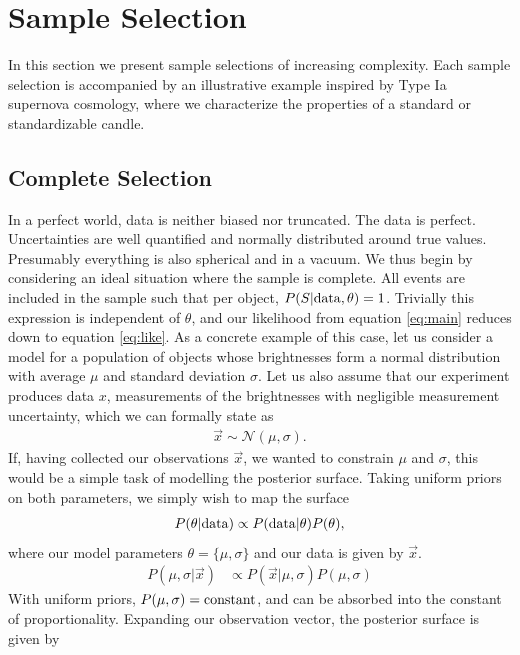 \documentclass[a4paper,fleqn,usenatbib]{mnras}
\begin{document}
\section{Sample Selection}
\label{sec:examples}

 In this section we present sample selections of increasing complexity. Each sample selection is accompanied by an illustrative example inspired by Type Ia supernova cosmology, where we characterize the properties of a standard or standardizable candle.
 
 
\subsection{Complete Selection}
\label{sec:perfect}
In a perfect world, data is neither biased nor truncated. The data is perfect. Uncertainties are well quantified and normally distributed around true values. Presumably everything is also spherical and in a vacuum. We thus begin by considering an ideal situation where the sample is complete.  All events are included in the sample such that per object, $P(S | {\rm data}, \theta)=1$.  Trivially this expression is independent of $\theta$, and our likelihood from equation \eqref{eq:main} reduces down to equation \eqref{eq:like}. As a concrete example of this case, let us consider a model for a population of objects whose brightnesses form a normal distribution with average $\mu$ and standard deviation $\sigma$.
Let us also assume that our experiment produces data $x$, measurements of the brightnesses with negligible measurement uncertainty, which we can formally state as
\begin{align}
\vec{x} \sim \mathcal{N}(\mu,\sigma).
\end{align}
If, having collected our observations $\vec{x}$, we wanted to constrain $\mu$ and $\sigma$, this would be a simple task of modelling the posterior surface. Taking uniform priors on both parameters, we simply wish to map the surface
\begin{align}
P(\theta | {\rm data}) \propto P({\rm data} | \theta) P(\theta),
\end{align}
where our model parameters $\theta = \lbrace \mu, \sigma \rbrace$ and our data is given by $\vec{x}$.
\begin{align}
P(\mu,\sigma| \vec{x}) &\propto P(\vec{x} | \mu, \sigma) P(\mu, \sigma)
\end{align}
With uniform priors, $P(\mu,\sigma) = {\rm constant}$, and can be absorbed into the constant of proportionality. Expanding our observation vector, the posterior surface is given by
\end{document}
